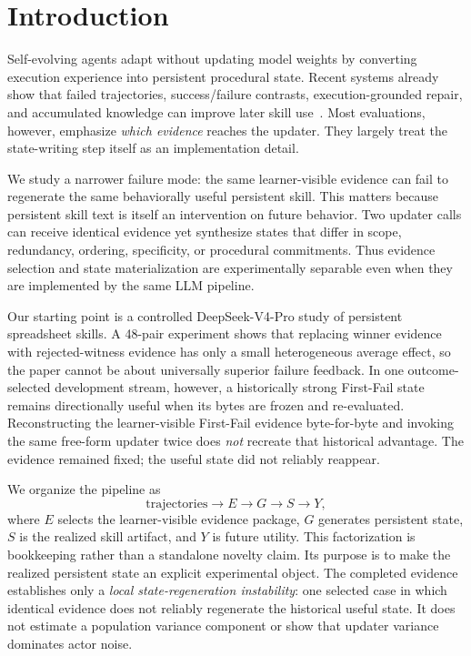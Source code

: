 \section{Introduction}

Self-evolving agents adapt without updating model weights by converting execution experience into persistent procedural state. Recent systems already show that failed trajectories, success/failure contrasts, execution-grounded repair, and accumulated knowledge can improve later skill use~\citep{liu2026rethinkskill,chen2026skillcat,liu2026skillrevise,tang2026wikiskill}. Most evaluations, however, emphasize \emph{which evidence} reaches the updater. They largely treat the state-writing step itself as an implementation detail.

We study a narrower failure mode: the same learner-visible evidence can fail to regenerate the same behaviorally useful persistent skill. This matters because persistent skill text is itself an intervention on future behavior. Two updater calls can receive identical evidence yet synthesize states that differ in scope, redundancy, ordering, specificity, or procedural commitments. Thus evidence selection and state materialization are experimentally separable even when they are implemented by the same LLM pipeline.

Our starting point is a controlled DeepSeek-V4-Pro study of persistent spreadsheet skills. A 48-pair experiment shows that replacing winner evidence with rejected-witness evidence has only a small heterogeneous average effect, so the paper cannot be about universally superior failure feedback. In one outcome-selected development stream, however, a historically strong First-Fail state remains directionally useful when its bytes are frozen and re-evaluated. Reconstructing the learner-visible First-Fail evidence byte-for-byte and invoking the same free-form updater twice does \emph{not} recreate that historical advantage. The evidence remained fixed; the useful state did not reliably reappear.

We organize the pipeline as
\begin{equation}
\text{trajectories}\rightarrow E\rightarrow G\rightarrow S\rightarrow Y,
\end{equation}
where $E$ selects the learner-visible evidence package, $G$ generates persistent state, $S$ is the realized skill artifact, and $Y$ is future utility. This factorization is bookkeeping rather than a standalone novelty claim. Its purpose is to make the realized persistent state an explicit experimental object. The completed evidence establishes only a \emph{local state-regeneration instability}: one selected case in which identical evidence does not reliably regenerate the historical useful state. It does not estimate a population variance component or show that updater variance dominates actor noise.

